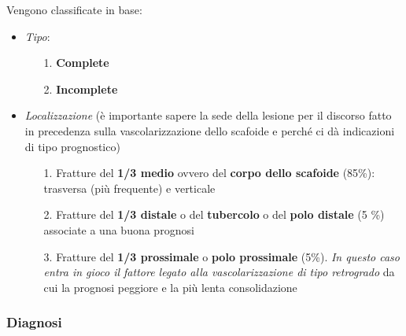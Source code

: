Vengono classificate in base:

\begin{itemize}
\item
  \emph{Tipo}:
\begin{itemize}
\item[1.] \textbf{Complete}
\item[2.] \textbf{Incomplete}
\end{itemize}
\item
  \emph{Localizzazione} (è importante sapere la sede della lesione per il discorso fatto in precedenza sulla vascolarizzazione dello scafoide e perché ci dà indicazioni di tipo prognostico)
\begin{itemize}
\item[1.]
  Fratture del \textbf{1/3 medio} ovvero del \textbf{corpo dello scafoide} (85\%): trasversa (più frequente) e verticale
\item[2.]
  Fratture del \textbf{1/3 distale} o del \textbf{tubercolo} o del \textbf{polo distale} (5 \%) associate a una buona prognosi
\item[3.]
  Fratture del \textbf{1/3 prossimale} o \textbf{polo prossimale} (5\%). \emph{In questo caso entra in gioco il fattore legato alla vascolarizzazione di tipo retrogrado} da cui la prognosi peggiore e la più lenta consolidazione
\end{itemize}
\end{itemize}

\subsubsection{Diagnosi}

